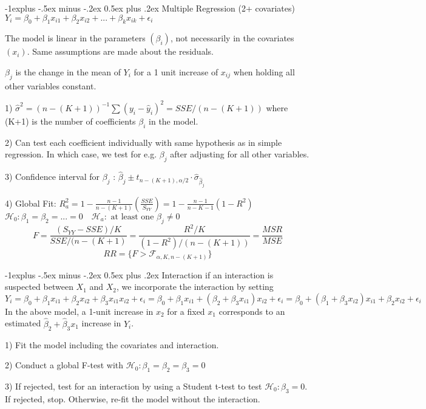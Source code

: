 \documentclass[8pt,landscape]{extarticle}
\makeatletter
\renewcommand{\subsection}{\@startsection{subsection}{2}{0mm}%
                                {-1explus -.5ex minus -.2ex}%
                                {0.5ex plus .2ex}%
                                {\normalfont\normalsize\bfseries}}
\makeatother
\begin{document}
\begin{multicols}{3}
\subsection{Multiple Regression (2+ covariates)}
$Y_i = \beta_0 + \beta_1 x_{i1} + \beta_2 x_{i2} + ... + \beta_k x_{ik} + \epsilon_i$

The model is linear in the parameters $(\beta_i)$, not necessarily in the covariates $(x_i)$. Same assumptions are made about the residuals. 

$\beta_j$ is the change in the mean of $Y_i$ for a 1 unit increase of $x_{ij}$ when holding all other variables constant.

1) $\hat{\sigma}^2 = (n - (K+1)) ^{-1} \sum (y_i -\hat{y}_i)^2 = SSE/(n-(K+1))$ where (K+1) is the number of coefficients $\beta_i$ in the model. 

2) Can test each coefficient individually with same hypothesis as in simple regression. In which case, we test for e.g. $\beta_j$ after adjusting for all other variables.

3) Confidence interval for $\beta_j$ : $\hat{\beta}_j \pm t_{n-(K+1), \alpha/2} \cdot \hat{\sigma}_{\hat{\beta}_j}$

4) Global Fit: $R^2_a = 1 - \frac{n-1}{n-(K+1)}\left(\frac{SSE}{S_{YY}}\right) = 1 - \frac{n-1}{n-K-1}(1-R^2) $
$\mathcal{H}_0 : \beta_1 = \beta_2 = ... = 0 \quad \mathcal{H}_a : \text{ at least one } \beta_j \neq 0$
$$F = \frac{(S_{YY} - SSE ) /K }{SSE/(n-(K+1)} = \frac{R^2/ K}{(1-R^2)/(n-(K+1))} = \frac{MSR}{MSE}$$
$$RR= \{F> \mathcal{F}_{\alpha, K, n-(K+1)} \}$$

\subsection{Interaction}
if an interaction is suspected between $X_1$ and $X_2$, we incorporate the interaction by setting
$
Y_i = \beta_0 + \beta_1x_{i1} + \beta_2x_{i2} + \beta_3 x_{i1} x_{i2} + \epsilon_i
	= \beta_0 + \beta_1x_{i1} +(\beta_2 + \beta_3x_{i1})x_{i2} + \epsilon_i
	= \beta_0 + (\beta_1 +\beta_3x_{i2})x_{i1} + \beta_2 x_{i2}+ \epsilon_i 
$
In the above model, a 1-unit increase in $x_2$ for a fixed $x_1$ corresponds to an estimated $\hat{\beta}_2 + \hat{\beta}_3 x_1$ increase in $Y_i$.

1) Fit the model including the covariates and interaction.

2) Conduct a global F-test with $\mathcal{H}_0 : \beta_1 = \beta_2 = \beta_3 = 0$

3) If rejected, test for an interaction by using a Student t-test to test $\mathcal{H}_0 : \beta_3 = 0$. If rejected, stop. Otherwise, re-fit the model without the interaction.


\end{multicols}
\end{document}
